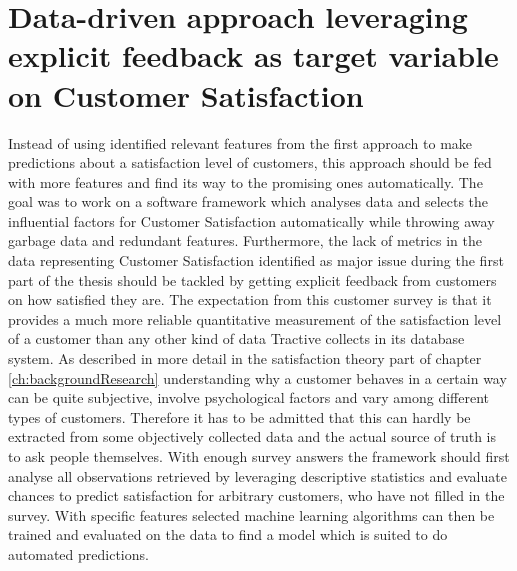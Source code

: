 \chapter{Data-driven approach leveraging explicit feedback as target variable on Customer Satisfaction}
\label{ch:dataDriven}
Instead of using identified relevant features from the first approach to make predictions about a satisfaction level of customers, this approach should be fed with more features and find its way to the promising ones automatically. The goal was to work on a software framework which analyses data and selects the influential factors for Customer Satisfaction automatically while throwing away garbage data and redundant features. Furthermore, the lack of metrics in the data representing Customer Satisfaction identified as major issue during the first part of the thesis should be tackled by getting explicit feedback from customers on how satisfied they are. The expectation from this customer survey is that it provides a much more reliable quantitative measurement of the satisfaction level of a customer than any other kind of data Tractive collects in its database system. As described in more detail in the satisfaction theory part of chapter \ref{ch:backgroundResearch} understanding why a customer behaves in a certain way can be quite subjective, involve psychological factors and vary among different types of customers. Therefore it has to be admitted that this can hardly be extracted from some objectively collected data and the actual source of truth is to ask people themselves. With enough survey answers the framework should first analyse all observations retrieved by leveraging descriptive statistics and evaluate chances to predict satisfaction for arbitrary customers, who have not filled in the survey. With specific features selected machine learning algorithms can then be trained and evaluated on the data to find a model which is suited to do automated predictions. 

